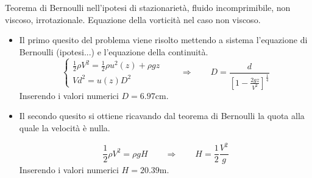 \sol

\partone
 Teorema di Bernoulli nell'ipotesi di stazionarietà, fluido incomprimibile, non viscoso, irrotazionale.
Equazione della vorticità nel caso non viscoso.

\parttwo

\begin{itemize}
\item Il primo quesito del problema viene risolto mettendo a sistema l'equazione di
 Bernoulli (ipotesi...) e l'equazione della continuità.
\begin{equation}
\begin{cases}
  \frac{1}{2} \rho V^2  = \frac{1}{2}\rho u^2(z) + \rho g z\\
  V d^2 = u(z) D^2
\end{cases} \qquad \Rightarrow \qquad D = \frac{d}
{\displaystyle\left[1 - \frac{2 g z}{V^2}\right]^{\frac{1}{4}}}
\end{equation}
 Inserendo i valori numerici $D = 6.97 \text{cm}$.

\item Il secondo quesito si ottiene ricavando dal teorema di Bernoulli la quota alla quale 
la velocità è nulla.

\begin{equation}
  \frac{1}{2} \rho V^2 = \rho g H \qquad \Rightarrow \qquad 
  H = \frac{1}{2} \frac{V^2}{g}
\end{equation}
 Inserendo i valori numerici $H = 20.39 \text{m}$.

\end{itemize}


